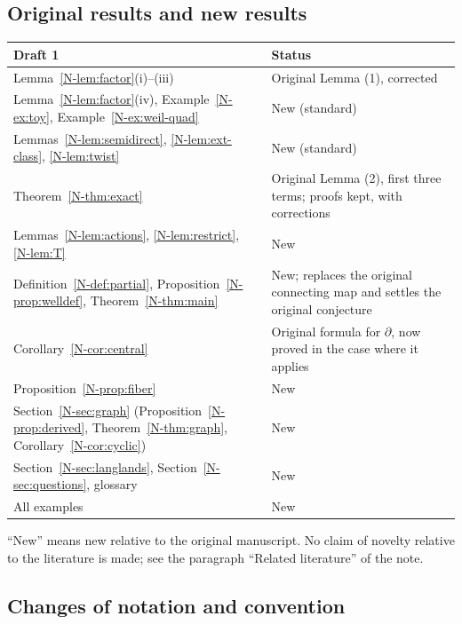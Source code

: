 \documentclass[12pt,letterpaper]{article}
\begin{document}
\subsection{Original results and new results}

\begin{center}
\begin{tabular}{@{}p{}p{}@{}}
\toprule
Draft 1 & Status \\
\midrule
Lemma~\ref{N-lem:factor}(i)--(iii) & Original Lemma (1), corrected \\
Lemma~\ref{N-lem:factor}(iv), Example~\ref{N-ex:toy},
Example~\ref{N-ex:weil-quad} & New (standard) \\
Lemmas~\ref{N-lem:semidirect}, \ref{N-lem:ext-class}, \ref{N-lem:twist}
& New (standard) \\
Theorem~\ref{N-thm:exact} & Original Lemma (2), first three terms;
proofs kept, with corrections \\
Lemmas~\ref{N-lem:actions}, \ref{N-lem:restrict}, \ref{N-lem:T} & New \\
Definition~\ref{N-def:partial}, Proposition~\ref{N-prop:welldef},
Theorem~\ref{N-thm:main} & New; replaces the original connecting map and
settles the original conjecture \\
Corollary~\ref{N-cor:central} & Original formula for $\partial$, now
proved in the case where it applies \\
Proposition~\ref{N-prop:fiber} & New \\
Section~\ref{N-sec:graph} (Proposition~\ref{N-prop:derived},
Theorem~\ref{N-thm:graph}, Corollary~\ref{N-cor:cyclic}) & New \\
Section~\ref{N-sec:langlands}, Section~\ref{N-sec:questions}, glossary &
New \\
All examples & New \\
\bottomrule
\end{tabular}
\end{center}

\noindent ``New'' means new relative to the original manuscript. No claim
of novelty relative to the literature is made; see the paragraph ``Related
literature'' of the note.

\subsection{Changes of notation and convention}
\end{document}
